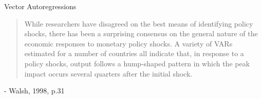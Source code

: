 %
%


\begin{frame}{Vector Autoregressions}

\begin{quotation}
While researchers have disagreed on the best means of identifying policy shocks, there has been a surprising consensus on the general nature of the economic responses to monetary policy shocks. A variety of VARs estimated for a number of countries all indicate that, in response to a policy shocks, output follows a hump-shaped pattern in which the peak impact occurs several quarters after the initial shock.
\end{quotation}
\center - Walsh, 1998, p.31

\end{frame}

